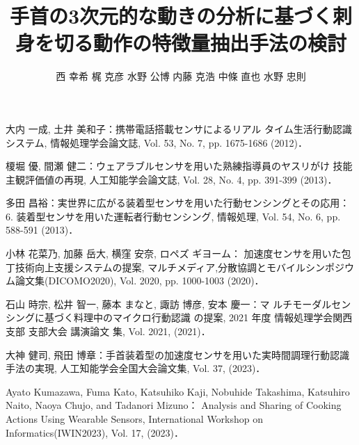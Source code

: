 \documentclass[a4j,8pt,twocolumn]{extarticle}
\title{手首の3次元的な動きの分析に基づく刺身を切る動作の特徴量抽出手法の検討}
\author{西 幸希\DAG{1} \qquad 梶 克彦\DAG{1} \qquad 水野 公博\DAG{2} \qquad 内藤 克浩\DAG{1} \qquad 中條 直也\DAG{1} \qquad 水野 忠則\DAG{1}}
\affiliation{\DAG{1}愛知工業大学情報科学部 \qquad \DAG{2}三菱電機エンジニアリング株式会社}
\begin{document}
	
\maketitle
\thispagestyle{empty}	%





\begin{thebibliography}{9}
大内 一成, 土井 美和子：携帯電話搭載センサによるリアル
タイム生活行動認識システム, 情報処理学会論文誌, Vol. 53,
No. 7, pp. 1675-1686 (2012)．

榎堀 優, 間瀬 健二：ウェアラブルセンサを用いた熟練指導員のヤスリがけ
技能主観評価値の再現, 人工知能学会論文誌, Vol. 28, No. 4, pp. 391-399 (2013)．

多田 昌裕：実世界に広がる装着型センサを用いた行動センシングとその応用：6. 装着型センサを用いた運転者行動センシング, 情報処理, Vol. 54, No. 6, pp. 588-591 (2013)．

小林 花菜乃, 加藤 岳大, 横窪 安奈, ロペズ ギヨーム：
加速度センサを用いた包丁技術向上支援システムの提案, マルチメディア,分散協調とモバイルシンポジウム論文集(DICOMO2020), Vol. 2020, pp. 1000-1003 (2020)．

石山 時宗, 松井 智一, 藤本 まなと, 諏訪 博彦, 安本 慶一：マ
ルチモーダルセンシングに基づく料理中のマイクロ行動認識
の提案, 2021 年度 情報処理学会関西支部 支部大会 講演論文
集, Vol. 2021, (2021)．

大神 健司, 飛田 博章：手首装着型の加速度センサを用いた実時間調理行動認識手法の実現,
 人工知能学会全国大会論文集, Vol. 37, (2023)．

Ayato Kumazawa, Fuma Kato, Katsuhiko Kaji, Nobuhide Takashima, Katsuhiro Naito, Naoya Chujo, and Tadanori Mizuno：
Analysis and Sharing of Cooking Actions Using Wearable Sensors, International Workshop on Informatics(IWIN2023), Vol. 17, (2023)．
 

\end{thebibliography}


\end{document}
